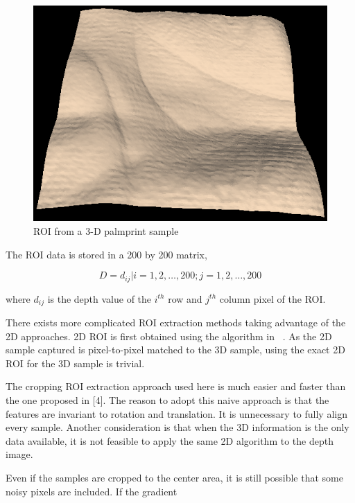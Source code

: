 \begin{figure}[htb]
  \begin{center}
    \includegraphics[width=0.9\linewidth]{ch-methodology/figures/sample-roi}
    \caption[ROI from a 3-D palmprint sample]{ROI from a 3-D palmprint sample}
    \label{fig:methodology:sample-roi}
  \end{center}
\end{figure}

The ROI data is stored in a 200 by 200 matrix,

\begin{equation}
\label{eq:methodology:roimatrix}
D=d_{ij}|i=1,2,\dots,200; j=1,2,\dots,200
\end{equation}

where $d_{ij}$ is the depth value of the $i^{th}$ row and $j^{th}$ column pixel of the ROI.

There exists more complicated ROI extraction methods taking advantage of the 2D approaches. 2D ROI is first obtained using the algorithm in ~\cite{Online palmprint identification}. As the 2D sample captured is pixel-to-pixel matched to the 3D sample, using the exact 2D ROI for the 3D sample is trivial.

The cropping ROI extraction approach used here is much easier and faster than the one proposed in [4]. The reason to adopt this naive approach is that the features are invariant to rotation and translation. It is unnecessary to fully align every sample. Another consideration is that when the 3D information is the only data available, it is not feasible to apply the same 2D algorithm to the depth image.

Even if the samples are cropped to the center area, it is still possible that some noisy pixels are included. If the gradient

